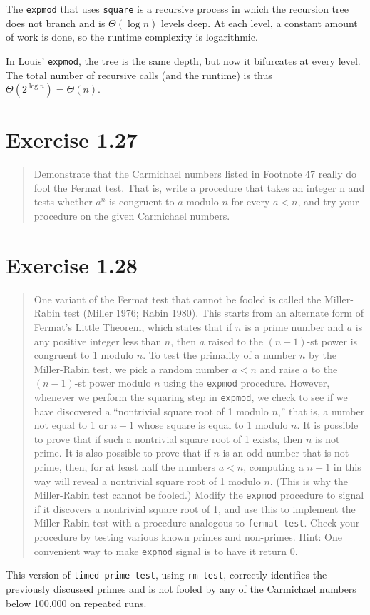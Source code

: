 \documentclass{article}
\begin{document}
The \texttt{expmod} that uses \texttt{square} is a recursive process in which
the recursion tree does not branch and is $\Theta(\log{n})$ levels deep. At each
level, a constant amount of work is done, so the runtime complexity is
logarithmic.

In Louis' \texttt{expmod}, the tree is the same depth, but now it bifurcates at
every level. The total number of recursive calls (and the runtime) is thus
$\Theta(2^{\log{n}})=\Theta(n)$.

\section{Exercise 1.27}
\begin{quote}
	Demonstrate that the Carmichael numbers listed in Footnote 47 really do
	fool the Fermat test. That is, write a procedure that takes an integer n and
	tests whether $a^n$ is congruent to $a$ modulo $n$ for every $a<n$, and try
	your procedure on the given Carmichael numbers.
\end{quote}



\section{Exercise 1.28}
\begin{quote}
    One variant of the Fermat test that cannot be fooled is called the
    Miller-Rabin test (Miller 1976; Rabin 1980). This starts from an alternate
    form of Fermat's Little Theorem, which states that if $n$ is a prime number
    and $a$ is any positive integer less than $n$, then $a$ raised to the
    $(n-1)$-st power is congruent to 1 modulo $n$. To test the primality of a
    number $n$ by the Miller-Rabin test, we pick a random number $a<n$ and
    raise $a$ to the $(n-1)$-st power modulo $n$ using the \texttt{expmod}
    procedure. However, whenever we perform the squaring step in
    \texttt{expmod}, we check to see if we have discovered a ``nontrivial square
    root of 1 modulo $n$,'' that is, a number not equal to 1 or $n-1$ whose
    square is equal to 1 modulo $n$. It is possible to prove that if such a
    nontrivial square root of 1 exists, then $n$ is not prime. It is also
    possible to prove that if $n$ is an odd number that is not prime, then, for
    at least half the numbers $a<n$, computing a $n-1$ in this way will reveal
    a nontrivial square root of 1 modulo $n$. (This is why the Miller-Rabin
    test cannot be fooled.) Modify the \texttt{expmod} procedure to signal if
    it discovers a nontrivial square root of 1, and use this to implement the
    Miller-Rabin test with a procedure analogous to \texttt{fermat-test}.
    Check your procedure by testing various known primes and non-primes. Hint:
    One convenient way to make \texttt{expmod} signal is to have it return 0.
\end{quote}



This version of \texttt{timed-prime-test}, using \texttt{rm-test}, correctly
identifies the previously discussed primes and is not fooled by any of the
Carmichael numbers below 100,000 on repeated runs.
\end{document}
